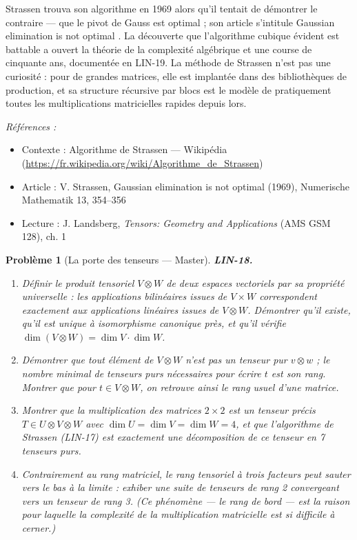 \documentclass[11pt]{article}
\newtheorem{problem}{Problème}
\newenvironment{refs}{\par\small\noindent\emph{Références :}\begin{itemize}\setlength\itemsep{0pt}}{\end{itemize}\normalsize}
\begin{document}
\noindent Strassen trouva son algorithme en 1969 alors qu'il tentait de démontrer le
contraire --- que le pivot de Gauss est optimal ; son article s'intitule \og{} Gaussian elimination is not
optimal \fg{}. La découverte que l'algorithme cubique \og{} évident \fg{} est battable a ouvert la théorie de la
complexité algébrique et une course de cinquante ans, documentée en LIN-19. La méthode de Strassen
n'est pas une curiosité : pour de grandes matrices, elle est implantée dans des bibliothèques de
production, et sa structure récursive par blocs est le modèle de pratiquement toutes les
multiplications matricielles rapides depuis lors.

\begin{refs}
\item Contexte : Algorithme de Strassen --- Wikipédia (\url{https://fr.wikipedia.org/wiki/Algorithme_de_Strassen})
\item Article : V. Strassen, \og{} Gaussian elimination is not optimal \fg{} (1969), Numerische Mathematik 13, 354--356
\item Lecture : J. Landsberg, \textit{Tensors: Geometry and Applications} (AMS GSM 128), ch. 1
\end{refs}

\bigskip

\begin{problem}[{La porte des tenseurs --- Master}]
\textbf{LIN-18.} \begin{enumerate}
\item[(i)] Définir le produit tensoriel $V \otimes W$ de deux espaces
vectoriels par sa propriété universelle : les applications bilinéaires issues de $V \times W$
correspondent exactement aux applications linéaires issues de $V \otimes W$. Démontrer qu'il existe,
qu'il est unique à isomorphisme canonique près, et qu'il vérifie
$\dim(V \otimes W) = \dim V \cdot \dim W$.
\item[(ii)] Démontrer que tout élément de $V \otimes W$ n'est pas un tenseur \og{} pur \fg{} $v \otimes w$ ; le
nombre minimal de tenseurs purs nécessaires pour écrire $t$ est son \textit{rang}. Montrer que pour
$t \in V \otimes W$, on retrouve ainsi le rang usuel d'une matrice.
\item[(iii)] Montrer que la multiplication des matrices $2 \times 2$
\og{} est \fg{} un tenseur précis $T \in U \otimes V \otimes W$ avec $\dim U = \dim V = \dim W = 4$, et
que l'algorithme de Strassen (LIN-17) est exactement une décomposition de ce tenseur en 7 tenseurs
purs.
\item[(iv)] Contrairement au rang matriciel, le rang tensoriel à trois facteurs peut sauter \textit{vers le bas}
à la limite : exhiber une suite de tenseurs de rang 2 convergeant vers un tenseur de rang 3. (Ce
phénomène --- le rang de bord --- est la raison pour laquelle la complexité de la multiplication
matricielle est si difficile à cerner.)
\end{enumerate}

\end{problem}
\end{document}
